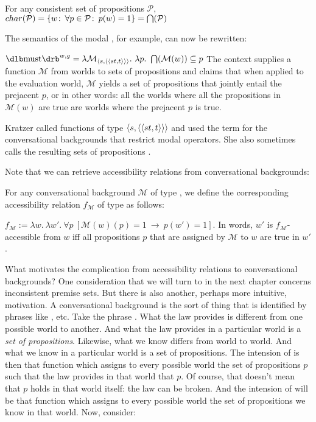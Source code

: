 \ex For any consistent set of propositions $\mathcal{P}$,\\
\(char({\mathcal{P}}) = \{w\co \forall p\in\mathcal{P}\co p(w)=1\} =
\bigcap(\mathcal{P})\) \xe

The semantics of the modal , for example, can now be rewritten:

\ex \(\exts{must} = \lambda \mathcal{M}_{\type{s,\type{\type{st,t}}}}.\ \lambda
p.\ \bigcap(\mathcal{M}(w)) \subseteq p\) \xe
%
The context supplies a function $\mathcal{M}$ from worlds to sets of
propositions and  claims that when applied to the evaluation
world, $\mathcal{M}$ yields a set of propositions that jointly entail the
prejacent $p$, or in other words: all the worlds where all the propositions in
$\mathcal{M}(w)$ are true are worlds where the prejacent $p$ is true.

Kratzer called functions of type $\langle s,\langle \langle st,t \rangle \rangle \rangle$
 and used the term  for the
conversational backgrounds that restrict modal operators. She also sometimes
calls the resulting sets of propositions .

\kwn
Note that we can retrieve accessibility relations from conversational
backgrounds:

\ex \label{convers}For any conversational background $\mathcal{M}$ of type
, we define the corresponding accessibility relation $f_{\mathcal{M}}$
of type  as follows:

$f_{\mathcal{M}} := \lambda w.\ \lambda w'.\ \forall p\ [ \mathcal{M}(w)(p)=1\ \rightarrow\ p(w')=1
]$. \xe
%
In words, $w'$ is $f_{\mathcal{M}}$-accessible from $w$ iff all propositions $p$
that are assigned by $\mathcal{M}$ to $w$ are true in $w'$.

What motivates the complication from accessibility relations to conversational
backgrounds? One consideration that we will turn to in the next chapter concerns
inconsistent premise sets. But there is also another, perhaps more intuitive,
motivation. A conversational background is the sort of thing that is identified
by phrases like , etc. Take the
phrase . What the law provides is different
from one possible world to another. And what the law provides in a particular
world is a \emph{set of propositions}. Likewise, what we know differs from world
to world. And what we know in a particular world is a set of propositions. The
intension of  is then that function which
assigns to every possible world the set of propositions $p$ such that the law
provides in that world that $p$. Of course, that doesn't mean that $p$ holds in
that world itself: the law can be broken. And the intension of  will be that function which assigns to every possible world the set
of propositions we know in that world. Now, consider:

